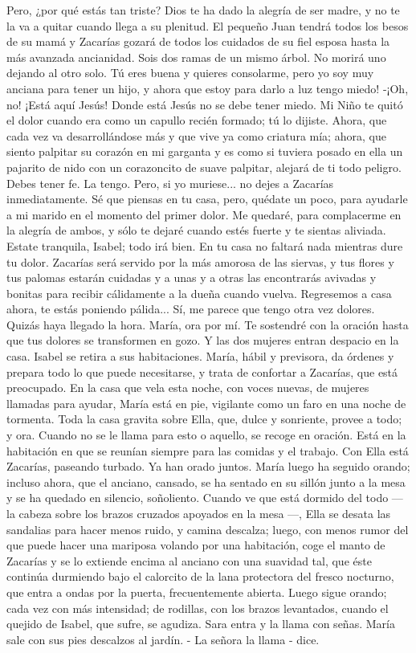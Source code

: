 \documentclass[12pt]{book} %
\begin{document}
Pero, ¿por qué estás tan triste? Dios te ha dado la alegría de ser madre, y no te la va a quitar cuando llega a su 
plenitud. El pequeño Juan tendrá todos los besos de su mamá y Zacarías gozará de todos los cuidados de su fiel esposa hasta la más avanzada ancianidad. Sois dos ramas de un mismo árbol. No morirá uno dejando al otro solo. 
Tú eres buena y quieres consolarme, pero yo soy muy anciana para tener un hijo, y ahora que estoy para darlo a luz tengo miedo! 
-¡Oh, no! ¡Está aquí Jesús! Donde está Jesús no se debe tener miedo. Mi Niño te quitó el dolor cuando era como un 
capullo recién formado; tú lo dijiste. Ahora, que cada vez va desarrollándose más y que vive ya como criatura mía; ahora, que siento palpitar su corazón en mi garganta y es como si tuviera posado en ella un pajarito de nido con un corazoncito de suave palpitar, alejará de ti todo peligro. Debes tener fe. 
La tengo. Pero, si yo muriese... no dejes a Zacarías inmediatamente. Sé que piensas en tu casa, pero, quédate un poco, para ayudarle a mi marido en el momento del primer dolor. 
Me quedaré, para complacerme en la alegría de ambos, y sólo te dejaré cuando estés fuerte y te sientas aliviada. Estate tranquila, Isabel; todo irá bien. En tu casa no faltará nada mientras dure tu dolor. Zacarías será servido por la más amorosa de las siervas, y tus flores y tus palomas estarán cuidadas y a unas y a otras las encontrarás avivadas y bonitas para recibir cálidamente a la dueña cuando vuelva. Regresemos a casa ahora, te estás poniendo pálida... 
Sí, me parece que tengo otra vez dolores. Quizás haya llegado la hora. María, ora por mí. 
Te sostendré con la oración hasta que tus dolores se transformen en gozo. 
Y las dos mujeres entran despacio en la casa. Isabel se retira a sus habitaciones. María, hábil y previsora, da órdenes y 
prepara todo lo que puede necesitarse, y trata de confortar a Zacarías, que está preocupado. 
En la casa que vela esta noche, con voces nuevas, de mujeres llamadas para ayudar, María está en pie, vigilante como 
un faro en una noche de tormenta. Toda la casa gravita sobre Ella, que, dulce y sonriente, provee a todo; y ora. Cuando no se le llama para esto o aquello, se recoge en oración. Está en la habitación en que se reunían siempre para las comidas y el trabajo. 
Con Ella está Zacarías, paseando turbado. Ya han orado juntos. María luego ha seguido orando; incluso ahora, que el anciano, cansado, se ha sentado en su sillón junto a la mesa y se ha quedado en silencio, soñoliento. Cuando ve que está dormido del todo — la cabeza sobre los brazos cruzados apoyados en la mesa —, Ella se desata las sandalias para hacer menos ruido, y camina descalza; luego, con menos rumor del que puede hacer una mariposa volando por una habitación, coge el manto de Zacarías y se lo extiende encima al anciano con una suavidad tal, que éste continúa durmiendo bajo el calorcito de la lana protectora del fresco nocturno, que entra a ondas por la puerta, frecuentemente abierta. Luego sigue orando; cada vez con más intensidad; de rodillas, con los brazos levantados, cuando el quejido de Isabel, que sufre, se agudiza. Sara entra y la llama con señas. María sale con sus pies descalzos al jardín. - La señora la llama - dice. 
\end{document}
